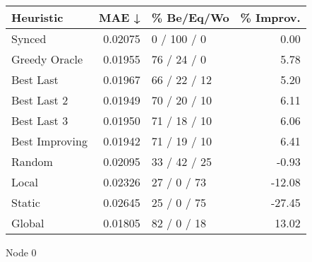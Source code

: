 \begin{tabular}{lrlr}
\toprule
\textbf{Heuristic} & \textbf{MAE ↓} & \textbf{\% Be/Eq/Wo} & \textbf{\% Improv.} \\
\midrule
            Synced &        0.02075 &          0 / 100 / 0 &                0.00 \\
     Greedy Oracle &        0.01955 &          76 / 24 / 0 &                5.78 \\
         Best Last &        0.01967 &         66 / 22 / 12 &                5.20 \\
       Best Last 2 &        0.01949 &         70 / 20 / 10 &                6.11 \\
       Best Last 3 &        0.01950 &         71 / 18 / 10 &                6.06 \\
    Best Improving &        0.01942 &         71 / 19 / 10 &                6.41 \\
            Random &        0.02095 &         33 / 42 / 25 &               -0.93 \\
             Local &        0.02326 &          27 / 0 / 73 &              -12.08 \\
            Static &        0.02645 &          25 / 0 / 75 &              -27.45 \\
            Global &        0.01805 &          82 / 0 / 18 &               13.02 \\
\bottomrule
\end{tabular}
\caption{Node 0}
\label{tab:iid_lr05_le2_bs4_0}
